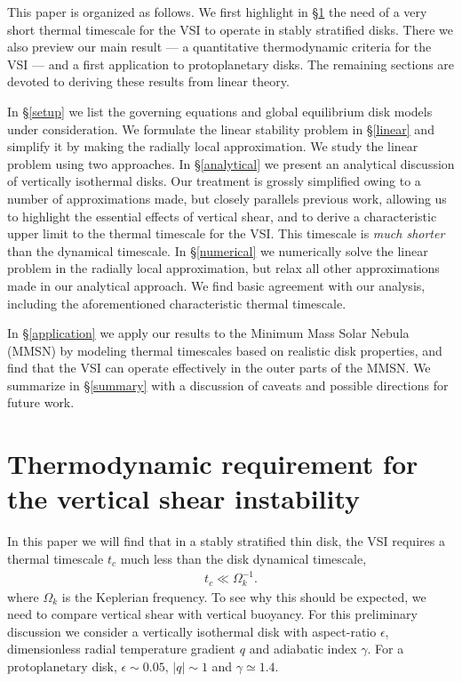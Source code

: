 \documentclass[iop]{emulateapj}
\begin{document}
This paper is organized as follows. We first highlight in
\S\ref{vsi_require} the need of a very short thermal timescale for the
VSI to operate in stably stratified disks. There we also preview our
main result --- a quantitative thermodynamic criteria for the VSI ---
and a first application to protoplanetary disks. The remaining sections
are devoted to deriving these results from linear theory. 

In \S\ref{setup} we list the governing equations and global
equilibrium disk models under   
consideration. We formulate the linear stability problem in 
\S\ref{linear} and simplify it by making the radially local
approximation. We study the linear problem using two approaches. In
\S\ref{analytical} we present an analytical discussion of vertically
isothermal disks. Our treatment is grossly simplified owing to a
number of approximations made, but closely parallels previous work, 
allowing us to highlight the essential effects of vertical shear, and to
derive a characteristic upper limit to the thermal timescale for the
VSI. This timescale is \emph{much shorter} than the dynamical
timescale. In \S\ref{numerical} we numerically
solve the linear problem in the radially local approximation, but
relax all other approximations made in our analytical approach.    
We find basic agreement with our analysis, including
the aforementioned characteristic thermal timescale. 

In
\S\ref{application} we apply our results to the Minimum Mass
Solar Nebula (MMSN) by modeling thermal 
timescales based on realistic disk properties, and find that the VSI
can operate effectively in the outer parts of the MMSN. We summarize in
\S\ref{summary} with a discussion of caveats and possible directions
for future work.  



\section{Thermodynamic requirement for the vertical shear instability}\label{vsi_require}     In this paper we will find that in a stably stratified thin disk, the VSI  
requires a thermal timescale $t_c$ much less than the
disk dynamical timescale, 
\begin{align}
  t _c \ll \Omega_k^{-1}. 
\end{align}
where $\Omega_k$ is the Keplerian frequency. 
To see why this should be expected, we need to compare vertical shear
with vertical buoyancy. For this preliminary discussion we consider a
vertically isothermal disk with aspect-ratio $\epsilon$,  
dimensionless radial temperature gradient $q$ and adiabatic index
$\gamma$. For a protoplanetary disk, $\epsilon \sim 0.05$, $|q|\sim 1$ and $\gamma\simeq 1.4$. 
\end{document}
